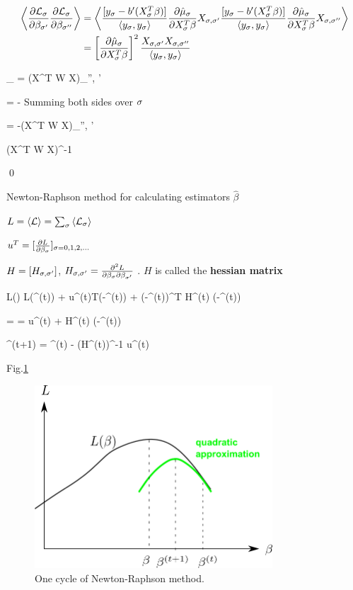 \begin{align}
\left\langle\frac{\partial{\cal L}_\sigma}{\partial\beta_ { \sigma'}}
\frac{\partial{\cal L}_\sigma}{\partial\beta_ { \sigma''}} \right\rangle
&=
\left\langle
\frac{[y_\sigma - b'(X_\sigma^T\beta)]}{\left\langle y_\sigma, y_\sigma\right\rangle}
 \frac{\partial\hat{\mu}_\sigma}{\partial X_\sigma^T\beta}
X_{\sigma, \sigma'}
\frac{[y_\sigma - b'(X_\sigma^T\beta)]}{\left\langle y_\sigma, y_\sigma\right\rangle}
 \frac{\partial\hat{\mu}_\sigma}{\partial X_\sigma^T\beta}
X_{\sigma, \sigma''}
\right\rangle
\\
&=
 \left[\frac{\partial\hat{\mu}_\sigma}{\partial X_\sigma^T\beta}\right]^2
\frac{X_{\sigma, \sigma'} X_{\sigma, \sigma''}}{\left\langle y_\sigma, y_\sigma\right\rangle}
\end{align}

\beq
\sum_{\s}
=
(X^T W X)_{\s'', \s'}
\eeq

\beq
{}
=
-
\eeq
Summing both sides over $\sigma$

\beq
{}
=
-(X^T W X)_{\s'', \s'}
\eeq

\beq
{}\rarrow (X^T W X)^{-1}
\eeq

\qed

Newton-Raphson method for calculating
estimators $\hat{\beta}$

$L=\left\langle{\cal L}\right\rangle =\sum_\sigma \left\langle{\cal L}_\sigma\right\rangle$

$u^T = [\frac{\partial L}{\partial\beta_\sigma}]_{\sigma=0,1,2, \ldots}$

 $H= [H_{\sigma, \sigma'}]$, $H_{\sigma, \sigma'} =
\frac{\partial^2 L }{\partial\beta_\sigma\partial\beta_{\sigma'}}$ .
$H$ is called the {\bf hessian matrix}


\beq
L(\beta)
\approx
L(\beta^{(t)})
+ u^{(t)T}(\beta-\beta^{(t)})
+ 
(\beta-\beta^{(t)})^T H^{(t)} (\beta-\beta^{(t)})
\eeq

 =
\pder{\av{\call}(\beta)}{\beta}
=
u^{(t)}
+
H^{(t)} (\beta-\beta^{(t)})
\eeq


\beq
\beta^{(t+1)} =
\beta^{(t)} -  (H^{(t)})^{-1} u^{(t)}
\eeq

Fig.\ref{fig-gml-new-rap}


\begin{figure}[h!]
\centering
\includegraphics[width=3.5in]
{gen-lin-mod/gen-lin-mod.png}
\caption{One cycle of Newton-Raphson method.}
\label{fig-gml-new-rap}
\end{figure}
